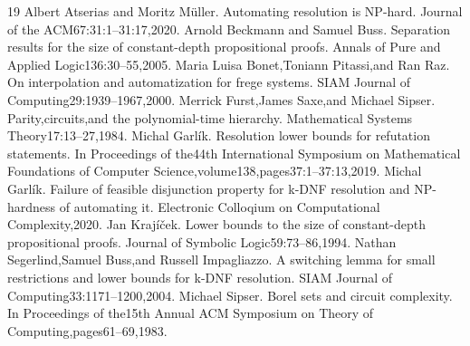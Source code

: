 \documentclass[10pt,a4paper]{article}
\begin{document}
\begin{thebibliography}{19}
 Albert Atserias and Moritz M\"uller. Automating resolution is NP-hard. Journal of the ACM67:31:1--31:17,2020.
 Arnold Beckmann and Samuel Buss. Separation results for the size of constant-depth propositional proofs. Annals of Pure and Applied Logic136:30--55,2005.
 Maria Luisa Bonet,Toniann Pitassi,and Ran Raz. On interpolation and automatization for frege systems. SIAM Journal of Computing29:1939--1967,2000.
 Merrick Furst,James Saxe,and Michael Sipser. Parity,circuits,and the polynomial-time hierarchy. Mathematical Systems Theory17:13--27,1984.
 Michal Garl\'ik. Resolution lower bounds for refutation statements. In Proceedings of the44th International Symposium on Mathematical Foundations of Computer Science,volume138,pages37:1--37:13,2019.
 Michal Garl\'ik. Failure of feasible disjunction property for k-DNF resolution and NP-hardness of automating it. Electronic Colloqium on Computational Complexity,2020.
 Jan Kraj\'i\v{c}ek. Lower bounds to the size of constant-depth propositional proofs. Journal of Symbolic Logic59:73--86,1994.
 Nathan Segerlind,Samuel Buss,and Russell Impagliazzo. A switching lemma for small restrictions and lower bounds for k-DNF resolution. SIAM Journal of Computing33:1171--1200,2004.
 Michael Sipser. Borel sets and circuit complexity. In Proceedings of the15th Annual ACM Symposium on Theory of Computing,pages61--69,1983.
\end{thebibliography}
\end{document}
